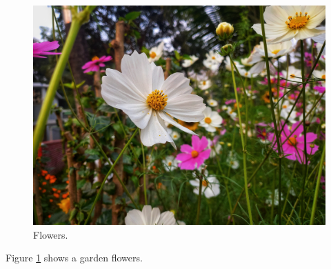 \documentclass{article}
\begin{document}
\begin{figure}
  \includegraphics[width=\linewidth]{20240131_162912-01.jpg}
  \caption{Flowers.}
  \label{fig:flowers}
\end{figure}

Figure \ref{fig:flowers} shows a garden flowers.
\end{document}
